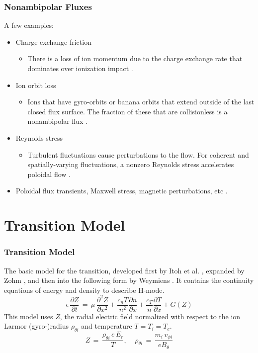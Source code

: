 \documentclass{beamer}
\begin{document}
\begin{frame}
\frametitle{Nonambipolar Fluxes}
A few examples:
\begin{itemize}
	\item Charge exchange friction
	\begin{itemize}
		\item There is a loss of ion momentum due to the charge exchange rate that dominates over ionization impact \cite{toda_condensed_neutrals_1997}.
	\end{itemize}
	\item Ion orbit loss
	\begin{itemize}
		\item Ions that have gyro-orbits or banana orbits that extend outside of the last closed flux surface. The fraction of these that are collisionless is a nonambipolar flux \cite{chankin_loss_1993}.
	\end{itemize}
	\item Reynolds stress
	\begin{itemize}
		\item Turbulent fluctuations cause perturbations to the flow. For coherent and spatially-varying fluctuations, a nonzero Reynolds stress accelerates poloidal flow \cite{diamond_poloidal_1991}.
	\end{itemize}
\item Poloidal flux transients, Maxwell stress, magnetic perturbations, etc \cite{staps_backstepping_2017}.
\end{itemize}
\end{frame}


\section{Transition Model}
\begin{frame}
\frametitle{Transition Model}
	The basic model for the transition, developed first by Itoh et al. \cite{itoh_edge_1991}, expanded by Zohm \cite{zohm_dynamic_1994}, and then into the following form by Weymiens \cite{weymiens_bifurcation_2014}.
It contains the continuity equations of energy and density to describe H-mode.
\begin{equation}
	\epsilon\,\frac{\partial Z}{\partial t} \,=\, \mu\,\frac{\partial^2 Z}{\partial x^2} + \frac{c_n T}{n^2} \frac{\partial n}{\partial x} + \frac{c_T}{n} \frac{\partial T}{\partial x} + G(Z)
	\label{eq:pde}
\end{equation}
This model uses $Z$, the radial electric field normalized with respect to the ion Larmor (gyro-)radius $\rho_{\theta i}$ and temperature $T = T_i = T_e$.
\begin{equation}
	Z \,=\, \frac{\rho_{\theta i} \, e \, E_r}{T}, ~~~~~ \rho_{\theta i} \,=\, \frac{m_i \, v_{\phi i}}{e B_\theta}
	\label{eq:normalization}
\end{equation}
\end{frame}
\end{document}

